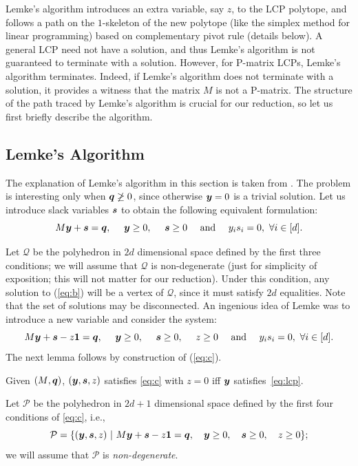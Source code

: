 \documentclass[a4paper,UKenglish]{lipics2}
\theoremstyle{definition}
\newcommand{\CPol}{\mbox{${\mathcal P}$}}
\newcommand{\CQ}{\mbox{${\mathcal Q}$}}
\newcommand{\yy}{\mbox{\boldmath $y$}}
\newcommand{\qq}{\mbox{\boldmath $q$}}
\newcommand{\one}{\mbox{\boldmath $1$}}
\newcommand{\MM}{\mbox{$M$}}
\newcommand{\ps}{\mbox{\boldmath $s$}}
\newcommand{\pq}{\mbox{\boldmath $q$}}
\begin{document}
Lemke's algorithm introduces an extra variable, say $z$, to the LCP polytope,
and follows a path on the $1$-skeleton of the new polytope (like the simplex 
method for linear programming) based
on complementary pivot rule (details below).  A general LCP need not have a
solution, and thus Lemke's algorithm is not guaranteed to terminate with a
solution.  However, for P-matrix LCPs, Lemke's algorithm terminates.  Indeed, if
Lemke's algorithm does not terminate with a solution, it provides a witness that
the matrix $M$ is not a P-matrix.  The structure of the path traced by Lemke's
algorithm is crucial for our reduction, so let us first briefly describe the
algorithm.

\subsection{Lemke's Algorithm}
\label{sec:lemke}

The explanation of Lemke's algorithm in this section is taken from \cite{GMSV}.
The problem is interesting only when $\qq \not \geq 0$, since otherwise $\yy = 0$ is a trivial solution. Let us introduce
slack variables $\ps$ to obtain the following equivalent formulation:
\begin{equation} \label{eq:b} \MM \yy  + \ps = \pq, \ \ \ \  \yy \geq 0, \ \ \ \ \ps \geq 0 \ \ \ \ \mbox{and} \ \ \ \ y_is_i = 0,\ \forall i\in[d].  \end{equation}

Let $\CQ$ be the polyhedron in $2d$ dimensional space defined by the first three conditions; we will assume that $\CQ$ is
non-degenerate (just for simplicity of exposition; this will not matter for our reduction).  
Under this condition, any solution to (\ref{eq:b}) will be a vertex of $\CQ$, since it must satisfy $2d$
equalities. Note that the set of solutions may be disconnected.
%
An ingenious idea of Lemke was to introduce a new variable and consider the system:
\begin{equation} \label{eq:c} \MM \yy  + \ps -z \one  = \pq, \ \ \ \  \yy \geq 0, \ \ \ \ \ps \geq 0, \ \ \ \  z \geq 0  \ \
\ \ \mbox{and} \ \ \ \ y_is_i = 0,\ \forall i\in[d].  \end{equation}
The next lemma follows by construction of (\ref{eq:c}).
\begin{lemma}\label{lem:lemke1}
Given $(\MM,\qq)$, $(\yy,\ps,z)$ satisfies \eqref{eq:c} with $z=0$ iff $\yy$ satisfies~\eqref{eq:lcp}.
\end{lemma}
%
Let $\CPol$ be the polyhedron in $2d + 1$ dimensional space defined by the first four conditions of \eqref{eq:c}, i.e.,
\begin{equation}\label{eq:cp}
\CPol = \{ (\yy,\ps, z) \ |\ \MM \yy  + \ps -z \one  = \pq, \ \ \ \yy \geq 0, \ \ \ \ps \geq 0, \ \ \  z \geq 0\};
\end{equation}
we will assume that $\CPol$ is {\em non-degenerate}.  
\end{document}
